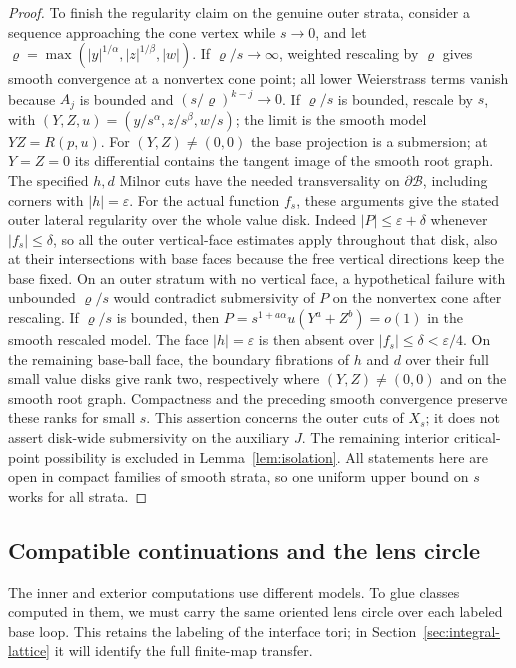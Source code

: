 \begin{proof}
To finish the regularity claim on the genuine outer strata, consider
a sequence approaching the cone vertex while \(s\to0\), and let
\(\varrho=\max(|y|^{1/\alpha},|z|^{1/\beta},|w|)\).
If \(\varrho/s\to\infty\), weighted rescaling by \(\varrho\) gives smooth
convergence at a nonvertex cone point; all lower Weierstrass terms
vanish because \(A_j\) is bounded and \((s/\varrho)^{k-j}\to0\).
If \(\varrho/s\) is bounded, rescale by \(s\), with
\((Y,Z,u)=(y/s^\alpha,z/s^\beta,w/s)\); the limit is the smooth
model \(YZ=R(p,u)\). For \((Y,Z)\ne(0,0)\)
the base projection is a submersion; at \(Y=Z=0\) its differential
contains the tangent image of the smooth root graph.
The specified \(h,d\) Milnor cuts have the needed transversality
on \(\partial\mathcal B\), including corners with \(|h|=\varepsilon\).
For the actual function \(f_s\), these arguments give the stated
outer lateral regularity over the whole value disk. Indeed
\(\lvert P\rvert\le\varepsilon+\delta\) whenever
\(\lvert f_s\rvert\le\delta\), so all the outer vertical-face
estimates apply throughout that disk, also at their intersections
with base faces because the free vertical directions keep the base
fixed. On an outer stratum with no vertical face, a hypothetical
failure with unbounded \(\varrho/s\) would contradict submersivity of
\(P\) on the nonvertex cone after rescaling. If \(\varrho/s\) is bounded,
then \(P=s^{1+a\alpha}u(Y^a+Z^b)=o(1)\) in the smooth rescaled
model. The face \(\lvert h\rvert=\varepsilon\) is then absent over
\(\lvert f_s\rvert\le\delta<\varepsilon/4\). On the remaining
base-ball face, the boundary fibrations of \(h\) and \(d\) over
their full small value disks give rank two, respectively where
\((Y,Z)\ne(0,0)\) and on the smooth root graph. Compactness and
the preceding smooth convergence preserve these ranks for small
\(s\). This assertion concerns the outer cuts of \(X_s\); it
does not assert disk-wide submersivity on the auxiliary \(J\).
The remaining interior critical-point possibility is excluded in
Lemma~\ref{lem:isolation}. All statements here are open in compact
families of smooth strata, so one uniform upper bound on \(s\)
works for all strata.

\end{proof}

\subsection{Compatible continuations and the lens circle}

The inner and exterior computations use different models. To glue
classes computed in them, we must carry the same oriented lens circle
over each labeled base loop. This retains the labeling of the
interface tori; in Section~\ref{sec:integral-lattice} it will identify
the full finite-map transfer.

